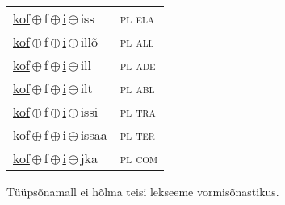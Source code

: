 \begin{minipage}{\textwidth}
\begin{sideways}
\begin{tabular}{l l}
\underline{kof}\,$\oplus$\,f\,$\oplus$\,\underline{i}\,$\oplus$\,iss & \textsc{ pl ela } \\
\underline{kof}\,$\oplus$\,f\,$\oplus$\,\underline{i}\,$\oplus$\,illõ & \textsc{ pl all } \\
\underline{kof}\,$\oplus$\,f\,$\oplus$\,\underline{i}\,$\oplus$\,ill & \textsc{ pl ade } \\
\underline{kof}\,$\oplus$\,f\,$\oplus$\,\underline{i}\,$\oplus$\,ilt & \textsc{ pl abl } \\
\underline{kof}\,$\oplus$\,f\,$\oplus$\,\underline{i}\,$\oplus$\,issi & \textsc{ pl tra } \\
\underline{kof}\,$\oplus$\,f\,$\oplus$\,\underline{i}\,$\oplus$\,issaa & \textsc{ pl ter } \\
\underline{kof}\,$\oplus$\,f\,$\oplus$\,\underline{i}\,$\oplus$\,jka & \textsc{ pl com } \\
\end{tabular}
\end{sideways}
\label{tab:tüüpsõnamall-koffi}

\end{minipage}

 
\vspace{1em}
\noindent Tüüpsõnamall  ei hõlma teisi lekseeme vormi\-sõnastikus.
